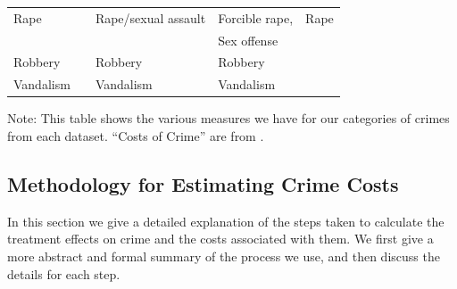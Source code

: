 \begin{table}[H]
\begin{threeparttable}
\begin{tabular}{lllll}
{Rape}			&				& Rape/sexual assault	&	Forcible rape, 	& Rape 				\\
				&				&						&	Sex offense		&					\\
{Robbery}			&				& Robbery 				&	Robbery			&					\\
{Vandalism}		&				& Vandalism				&	Vandalism		& 				\\	\bottomrule
\end{tabular}
\begin{tablenotes}
\item Note: This table shows the various measures we have for our categories of crimes from each dataset. ``Costs of Crime'' are from \cite{McCollister_etal_2010_DAD}.
\end{tablenotes}
\end{threeparttable}
\end{table}

\subsection{Methodology for Estimating Crime Costs}
\noindent In this section we give a detailed explanation of the steps taken to calculate the treatment effects on crime and the costs associated with them. We first give a more abstract and formal summary of the process we use, and then discuss the details for each step. \\

